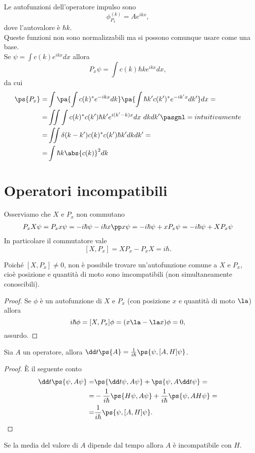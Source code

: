 Le autofunzioni dell'operatore impulso sono
\[\phi^{(k)}_{P_x}=Ae^{ikx},\]
dove l'autovalore \`e $\hbar k$.\\
Queste funzioni non sono normalizzabili ma si possono comunque usare come una base.\\
Se $\psi=\int c(k)e^{ikx}dx$ allora
\[P_x\psi=\int c(k)\hbar k e^{ikx}dx,\]
da cui
\begin{align*}
\ps{P_x}=&\int\pa{\int c(k)^\ast e^{-ikx}dk}\pa{\int \hbar k'c(k')^\ast e^{-ik'x}dk'}dx=\\
=&\iint \int c(k)^\ast c(k') \hbar k' e^{i(k'-k)x}dx\ dkdk'\pasgnl={intuitivamente}\\
=&\iint\delta(k-k')c(k)^\ast c(k') \hbar k'dkdk'=\\
=&\int \hbar k\abs{c(k)}^2dk
\end{align*}

\section{Operatori incompatibili}

\begin{remark}
Osserviamo che $X$ e $P_x$ non commutano
\begin{align*}
P_xX\psi=P_xx\psi=-i\hbar \psi -i\hbar x\pp x\psi=-i\hbar \psi+xP_x\psi=-i\hbar \psi+XP_x\psi
\end{align*}
In particolare il commutatore vale
\[[X,P_x]=XP_x-P_xX=i\hbar.\]
\end{remark}

\begin{remark}
Poich\'e $[X,P_x]\neq 0$, non \`e possibile trovare un'autofunzione comune a $X$ e $P_x$, cio\`e posizione e quantit\`a di moto sono imcompatibili (non simultaneamente conoscibili).
\end{remark}
\begin{proof}
Se $\phi$ \`e un autofunzione di $X$ e $P_x$ (con posizione $x$ e quantit\`a di moto $\la$) allora
\[i\hbar \phi=[X,P_x]\phi=(x\la-\la x)\phi=0,\]
assurdo.
\end{proof}



\begin{proposition}
Sia $A$ un operatore, allora
$\dd t{}\ps{A}=\frac1{i\hbar}\ps{\psi,[A,H]\psi}$.
\end{proposition}
\begin{proof}
\`E il seguente conto
\begin{align*}
\dd t{}\ps{\psi,A\psi}=&\ps{\dd t\psi,A\psi}+\ps{\psi,A\dd t\psi}=\\
=&-\frac1{i\hbar}\ps{H\psi,A\psi}+\frac1{i\hbar}\ps{\psi,AH\psi}=\\
=&\frac1{i\hbar}\ps{\psi,[A,H]\psi}.
\end{align*}
\end{proof}
\begin{corollary}
Se la media del valore di $A$ dipende dal tempo allora $A$ \`e incompatibile con $H$.
\end{corollary}


